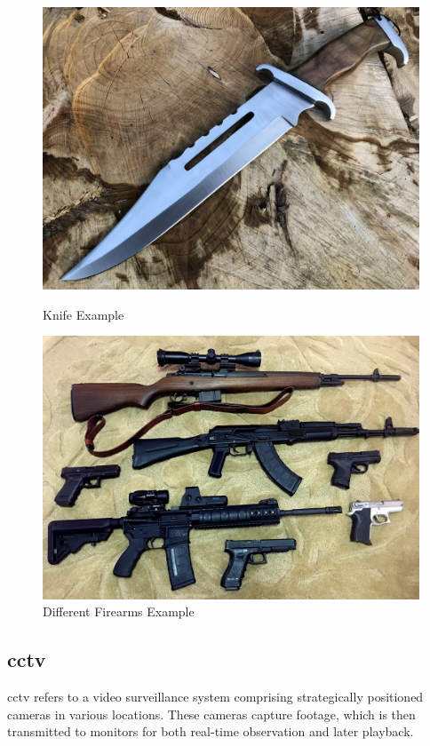 \begin{figure}[h]
    \centering
    \begin{minipage}{0.45\textwidth}
        \centering
        \includegraphics[width=1\linewidth]{figs/knife.jpg}
        \caption{Knife Example}
        \label{fig:first_image}
    \end{minipage}\hfill
    \begin{minipage}{0.48\textwidth}
        \centering
        \includegraphics[width=1\linewidth]{figs/firearm.png}
        \caption{Different Firearms Example}
        \label{fig:second_image}
    \end{minipage}
\end{figure}

\subsection{\ac{cctv}}
\ac{cctv} refers to a video surveillance system comprising strategically positioned cameras in various locations. These cameras capture footage, which is then transmitted to monitors for both real-time observation and later playback.

